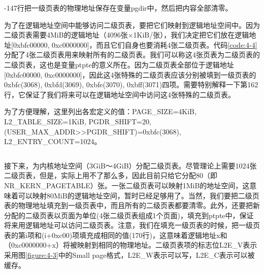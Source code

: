 \documentclass[main.tex]{subfiles}
\begin{document}
\begin{CJK*}{UTF8}{song}
\begin{code}
\label{code:4-3}
\inputminted[firstline=145,lastline=157,linenos,numbersep=5pt,frame=lines,framesep=2mm]{c}{src/chapter04/kernel/machdep.c}
\end{code}

-147行把一级页表的物理地址保存在变量pgdir中，然后把内容全部清零。

\par
为了在逻辑地址空间中能够访问二级页表，要把它们映射到逻辑地址空间中。因为二级页表需要4MiB的逻辑地址（4096张$\times$1KiB/张），我们决定把它们放在逻辑地址[0xbfc00000, 0xc0000000]，而且它们自身也要消耗4张二级页表。代码\ref{code:4-4}分配了4张二级页表用来映射所有的二级页表。我们可以称这4张页表为二级页表的二级页表，这也是变量ptpte的意义所在。因为二级页表全部位于逻辑地址[0xbfc00000, 0xc0000000]，因此这4张特殊的二级页表应该分别被填到一级页表的0xbfc(3068), 0xbfd(3069), 0xbfe(3070), 0xbff(3071)四项。需要特别解释一下第162行，它保证了我们将来可以在逻辑地址空间中访问这4张特殊的二级页表。

\par
为了方便理解，这里列出各宏定义的值：PAGE\_SIZE=4KiB, L2\_TABLE\_SIZE=1KiB, PGDR\_SHIFT=20, (USER\_MAX\_ADDR\textgreater\textgreater PGDR\_SHIFT)=0xbfc(3068), L2\_ENTRY\_COUNT=1024。

\begin{code}
\label{code:4-4}
\inputminted[firstline=159,lastline=170,linenos,numbersep=5pt,frame=lines,framesep=2mm]{c}{src/chapter04/kernel/machdep.c}
\end{code}

接下来，为内核地址空间（3GiB～4GiB）分配二级页表。尽管理论上需要1024张二级页表，但是，实际上用不了那么多，因此目前只给它分配80（即NR\_KERN\_PAGETABLE）张。一张二级页表可以映射1MiB的地址空间，这意味着可以映射80MiB的逻辑地址空间，暂时已经足够用了。当然，我们要把二级页表的物理地址填充到一级页表中，而且所有的二级页表都要清零。此外，还要把新分配的二级页表以页面为单位(4张二级页表组成1个页面)，填充到ptpte中，保证将来用逻辑地址可以访问二级页表。注意，我们在填充一级页表的时候，把一级页表的第i项和(i+0xc00)项填充成相同的值(170行)，这意味着逻辑地址x和（0xc0000000+x）将被映射到相同的物理地址。二级页表项的标志位L2E\_V表示采用图\ref{figure:4-3}中的Small page格式，L2E\_W表示可以写，L2E\_C表示可以被缓存。

\begin{code}
\label{code:4-5}
\inputminted[firstline=172,lastline=185,linenos,numbersep=5pt,frame=lines,framesep=2mm]{c}{src/chapter04/kernel/machdep.c}
\end{code}


\end{CJK*}
\end{document}
